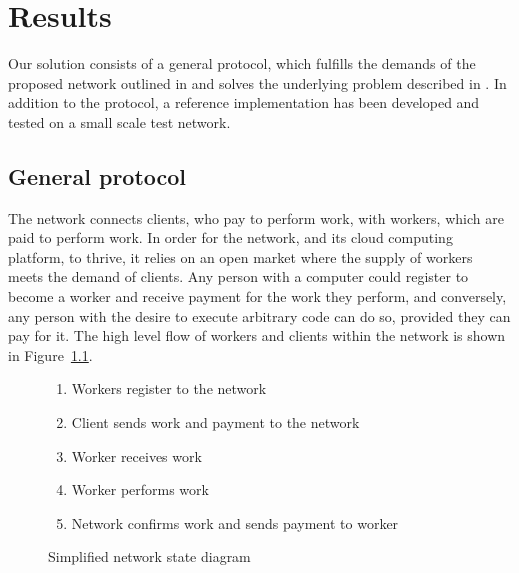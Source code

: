 \chapter{Results}
Our solution consists of a general protocol, which fulfills the demands of the proposed network outlined in  and solves the underlying problem described in .
In addition to the protocol, a reference implementation has been developed and tested on a small scale test network.

\section{General protocol}
\label{sec:res:protocol}
The network connects clients, who pay to perform work, with workers, which are paid to perform work. In order for the network, and its cloud computing platform, to thrive, it relies on an open market where the supply of workers meets the demand of clients. Any person with a computer could register to become a worker and receive payment for the work they perform, and conversely, any person with the desire to execute arbitrary code can do so, provided they can pay for it. The high level flow of workers and clients within the network is shown in Figure~\ref{network-schema}.

\begin{figure}[ht]
\centering
{}

\begin{enumerate}
\item Workers register to the network
\item Client sends work and payment to the network
\item Worker receives work
\item Worker performs work
\item Network confirms work and sends payment to worker
\end{enumerate}
\caption{Simplified network state diagram}
\label{network-schema}
\end{figure}

